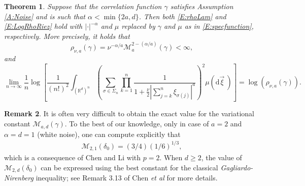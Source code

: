 \documentclass[12pt]{report}
\theoremstyle{plain}
\newtheorem{theorem}{Theorem}[section]
\theoremstyle{definition}
\newtheorem{remark}[theorem]{Remark}
\numberwithin{equation}{section}
\newcommand{\R}{\mathbb{R}}
\newcommand{\ud}{\ensuremath{ \mathrm{d} }}
\begin{document}
\begin{theorem} \label{T:Variation}
	Suppose that the correlation function $\gamma$ satisfies Assumption \ref{A:Noise} and is such that
	$\alpha < \min\{2a,d\}$. Then both \eqref{E:rhoLam} and \eqref{E:LogRhoRiez} hold with
	$|\cdot|^{-\alpha}$ and $\mu$ replaced by $\gamma$ and $\mu$ as in \eqref{E:specfunction},
	respectively. More precisely, it holds that
	\begin{equation} \label{E:rhoMrep}
	\rho_{\nu,a}(\gamma) = \nu^{-\alpha/a} \mathcal{M}_a^{2-(\alpha / a)}(\gamma)<\infty,
	\end{equation}
	and
	\begin{equation} \label{E:LogRho}
	\lim_{n \to \infty} \frac{1}{n} \log \left[ \frac{1}{(n!)^2} \int_{(\R^d)^n} \left( \sum_{\sigma \in \Sigma_n} \prod_{k=1}^n \frac{1}{1+ \frac{\nu}{2}|\sum_{j=k}^n \xi_{\sigma(j)}|^a}\right)^2 \mu (\ud \vec{\xi}\:)\right]
	= \log\left( \rho_{\nu, a}\left(\gamma\right) \right).
	\end{equation}
\end{theorem}

\begin{remark} \label{R:Constant}
	It is often very difficult to obtain the exact value for the variational constant
	$\mathcal{M}_{a,d}(\gamma)$. To the best of our knowledge, only in case of $a=2$ and $\alpha=d=1$
	(white noise), one can compute explicitly that
	\begin{align} \label{E:Mdelta1d}
	\mathcal{M}_{2,1}(\delta_0)= (3/4)(1/6)^{1/3},
	\end{align}
	which is a consequence of Chen and Li \cite[Lemma .2]{chen.li:04:large} with $p=2$. When $d\ge 2$, the
	value of $\mathcal{M}_{2,d}(\delta_0)$ can be expressed using the best constant for the classical
	{\it Gagliardo-Nirenberg} inequality; see Remark 3.13 of Chen {\it et al} \cite{chen.deya.ea:21:moment} for more
	details.
\end{remark}
\end{document}
